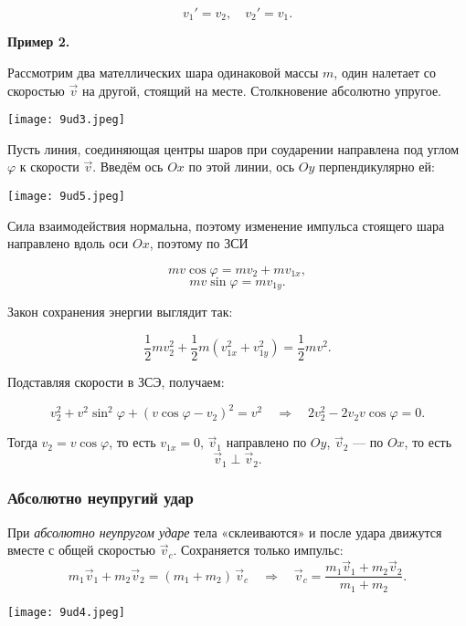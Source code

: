 \documentclass[12pt, a4paper]{article}%
\begin{document}
\[
v_{1}'=v_{2},\quad v_{2}'=v_{1}.
\]

\textbf{Пример 2.}

Рассмотрим два мателлических шара одинаковой массы $m$, один налетает со скоростью $\vec v$ на другой, стоящий на месте. Столкновение абсолютно упругое.

\begin{center}
\texttt{[image: 9ud3.jpeg]}
\label{fig:mpr}
\end{center}


Пусть линия, соединяющая центры шаров при соударении направлена под углом $\varphi$ к скорости $\vec v$. Введём ось $Ox$ по этой линии, ось $Oy$ перпендикулярно ей:

\begin{center}
\texttt{[image: 9ud5.jpeg]}
\label{fig:mpr}
\end{center}

Сила взаимодействия нормальна, поэтому изменение импульса стоящего шара направлено вдоль оси $Ox$, поэтому по ЗСИ

\[
mv\cos\varphi = mv_2+mv_{1x},
\]
\[
mv\sin\varphi = mv_{1y}.
\]

Закон сохранения энергии выглядит так:

\[
\frac12mv_2^2+\frac12m(v_{1x}^2+v_{1y}^2) = \frac12mv^2.
\]

Подставляя скорости в ЗСЭ, получаем:

\[
v_2^2 + v^2\sin^2\varphi+(v\cos\varphi-v_2)^2 = v^2 \quad\Rightarrow\quad 2v_2^2-2v_2v\cos\varphi = 0.
\]

Тогда $v_2 = v\cos\varphi$, то есть $v_{1x} =0 $, $\vec v_1$ направлено по $Oy$, 
$\vec v_2$ --- по $Ox$, то есть
\[
\vec v_1 \perp \vec v_2.
\]






\subsubsection*{Абсолютно неупругий удар}
При \textit{абсолютно неупругом ударе} тела «склеиваются» и после удара движутся вместе с общей скоростью \(\vec v_c\). Сохраняется только импульс:
\[
m_1\vec v_{1}+m_2\vec v_{2}=(m_1+m_2)\,\vec v_c
\quad\Longrightarrow\quad
\vec v_c=\frac{m_1\vec v_{1}+m_2\vec v_{2}}{m_1+m_2}.
\]

\begin{center}
\texttt{[image: 9ud4.jpeg]}
\label{fig:mpr}
\end{center}
\end{document}
